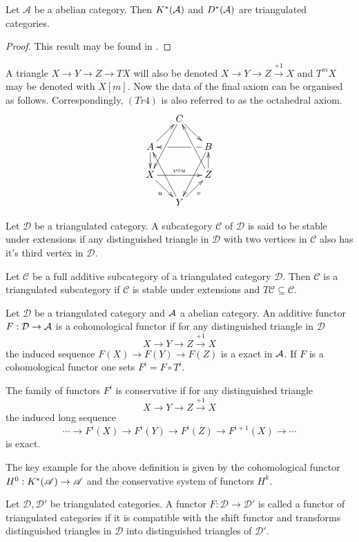 \begin{proposition}
 Let $\mathcal{A}$ be a abelian category. Then $K^*(\AA)$ and $D^*(\AA)$ are triangulated categories.
\end{proposition}
\begin{proof}
  This result may be found in \cite[Chapter 1]{dimca2004sheaves}.
\end{proof}
A triangle $X\to Y \to Z \to TX$ will also be denoted $X\to Y \to Z \xrightarrow{+1} X$ and $T^m X$ may be denoted with $X[m]$.
Now the data of the final axiom can be organised as follows.
Correspondingly, $(Tr4)$ is also referred to as the octahedral axiom.
\begin{equation*}
\xymatrix@=1.6em{
& C \ar@{->}[dr] \ar[ddl] & \\
A \ar@{->}[ur] \ar[d]& &
   B\ar[ll]|(0.25)\hole|(0.75)\hole
      \ar[ddl] \\
X \ar[rr]^{v \circ u} \ar[dr]_u & &
   Z \ar[u] \ar[uul]\\
& Y \ar[ur]_v \ar[uul]&
}
\end{equation*}
\begin{definition}
 Let $\mathcal{D}$ be a triangulated category. A subcategory $\mathcal{C}$ of $\mathcal{D}$ is said to be stable under extensions if any distinguished triangle in $\mathcal{D}$ with two vertices in $\mathcal{C}$ also has it's third vertex in $\mathcal{D}$.
\end{definition}
\begin{definition}
 Let $\mathcal{C}$ be a full additive subcategory of a triangulated category $\mathcal{D}$. Then $\mathcal{C}$ is a triangulated subcategory if $\mathcal{C}$ is stable under extensions and $T\mathcal{C}\subseteq \mathcal{C}$.
\end{definition}

\begin{definition}
 Let $\mathcal{D}$ be a triangulated category and $\AA$ a abelian category.
 An additive functor $F:\mathcal{D} \to \AA$ is a cohomological functor if for any distinguished triangle in $\mathcal{D}$
 $$X \to Y \to Z\xrightarrow{+1} X $$
 the induced sequence $F(X) \to F(Y) \to F(Z) $
 is a exact in $\AA$. If $F$ is a cohomological functor one sets $F^i = F\circ T^i$.

 The family of functors $F^i$ is conservative if for any distinguished triangle
 $$X \to Y \to Z \xrightarrow{+1} X$$
 the induced long sequence
 $$\cdots \to F^i(X) \to F^i(Y) \to F^i(Z) \to F^{i+1}(X) \to \cdots $$
 is exact.
\end{definition}
The key example for the above definition is given by the cohomological functor $H^0: K^*(\A) \to \A$ and the conservative system of functors $H^k$.
\begin{definition}
 Let $\mathcal{D}, \mathcal{D}'$ be triangulated categories.
 A functor $F:\mathcal{D} \to \mathcal{D}'$ is called a functor of triangulated categories if it is compatible with the shift functor and transforms distinguished triangles in $\mathcal{D}$ into distinguished triangles of $\mathcal{D}'$.
\end{definition}

